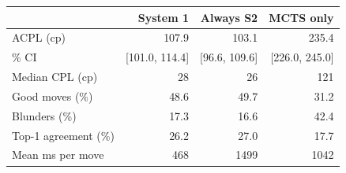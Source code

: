 \footnotesize\setlength{\tabcolsep}{4pt}\begin{tabular}{lrrr}
\toprule
 & System 1 & Always S2 & MCTS only \\
\midrule
ACPL (cp) & 107.9 & 103.1 & 235.4 \\
\quad 95\% CI & [101.0, 114.4] & [96.6, 109.6] & [226.0, 245.0] \\
Median CPL (cp) & 28 & 26 & 121 \\
Good moves (\%) & 48.6 & 49.7 & 31.2 \\
Blunders (\%) & 17.3 & 16.6 & 42.4 \\
Top-1 agreement (\%) & 26.2 & 27.0 & 17.7 \\
Mean ms per move & 468 & 1499 & 1042 \\
\bottomrule
\end{tabular}
